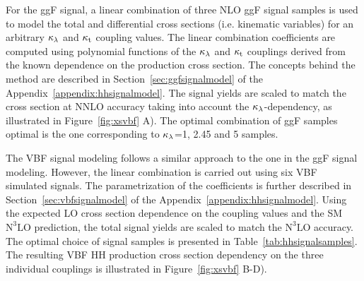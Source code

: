 For the ggF signal, a linear combination of three NLO ggF signal samples is used to model the total and differential cross sections (i.e. kinematic variables)  for an arbitrary $\kappa_{\lambda}$ and $\mathrm{\kappa_{t} }$ coupling values. The linear combination coefficients are computed using polynomial functions of the $\kappa_{\lambda}$ and $\mathrm{\kappa_{t} }$ couplings derived from the known dependence on the production cross section. The concepts behind the method are described in Section~\ref{sec:ggfsignalmodel} of the Appendix~\ref{appendix:hhsignalmodel}. The signal yields are scaled to match the cross section at NNLO accuracy taking into account the $\kappa_{\lambda}$-dependency, as illustrated in Figure~\ref{fig:xsvbf} A). The optimal combination of ggF samples optimal is the one corresponding to $\kappa_{\lambda}$=1, 2.45 and 5 samples. 

The VBF signal modeling follows a similar approach to the one in the ggF signal modeling. However, the linear combination is carried out using six VBF simulated signals. The parametrization of the coefficients is further described in Section~\ref{sec:vbfsignalmodel} of the Appendix~\ref{appendix:hhsignalmodel}. Using the expected LO cross section dependence on the coupling values and the SM $\mathrm{N^{3}LO}$ prediction, the total signal yields are scaled to match the $\mathrm{N^{3}LO}$ accuracy. The optimal choice of signal samples is presented in Table~\ref{tab:hhsignalsamples}. The resulting VBF HH production cross section dependency on the three individual couplings is illustrated in Figure~\ref{fig:xsvbf} B-D).

